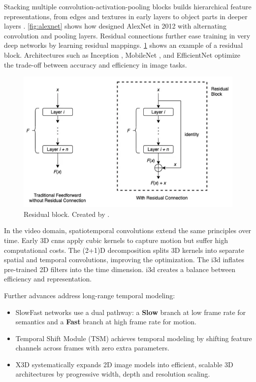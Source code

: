 Stacking multiple convolution-activation-pooling blocks builds hierarchical feature representations, from edges and textures in early layers to object parts in deeper layers \cite{lecun_deep_learning_2015}. \cref{fig:alexnet} shows how \textcite{krizhevsky_alexnet} designed AlexNet in 2012 with alternating convolution and pooling layers. Residual connections \cite{he_deep_residual_2015} further ease training in very deep networks by learning residual mappings. \cref{fig:res_connection} shows an example of a residual block. Architectures such as Inception \cite{szegedy_going_2014}, MobileNet \cite{howard_mobilenets_2017}, and EfficientNet \cite{tan_efficientnet_2020} optimize the trade-off between accuracy and efficiency in image tasks. 

\begin{figure}
    \centering
    \includegraphics[width=0.5\linewidth]{figures/res_connection.png} 
    \caption{Residual block. Created by \textcite{wong_what_is_residual_2022}.}
    \label{fig:res_connection}
\end{figure}

In the video domain, spatiotemporal convolutions extend the same principles over time. Early 3D \acrshort{cnn}s \cite{tran_learning_2015} apply cubic kernels to capture motion but suffer high computational costs. The (2+1)D decomposition \cite{tran_2_plus_1_convolution} splits 3D kernels into separate spatial and temporal convolutions, improving the optimization. The \acrfull{i3d} \cite{carreira_2017_i3d_quo_vadis} inflates pre-trained 2D filters into the time dimension. \acrshort{i3d} creates a balance between efficiency and representation.

Further advances address long-range temporal modeling:
\begin{itemize}
    \item SlowFast networks \cite{feichtenhofer_slowfast_2019} use a dual pathway: a \textbf{Slow} branch at low frame rate for semantics and a \textbf{Fast} branch at high frame rate for motion.  
    \item Temporal Shift Module (TSM) \cite{lin_temporal_shift_2019} achieves temporal modeling by shifting feature channels across frames with zero extra parameters.  
    \item X3D \cite{feichtenhofer_x3d_2020} systematically expands 2D image models into efficient, scalable 3D architectures by progressive width, depth and resolution scaling.
\end{itemize}

